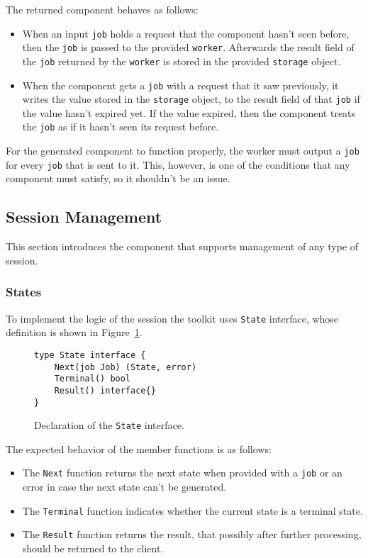 \newpage
The returned component behaves as follows:
\begin{itemize}
  \item When an input \texttt{job} holds a request that the component 
        hasn't seen before, then the \texttt{job} is passed to the 
        provided \texttt{worker}. Afterwards the result field of the \texttt{job}
        returned by the \texttt{worker} is stored in the provided 
        \texttt{storage} object.

  \item When the component gets a \texttt{job} with a request that it saw 
        previously, it writes the value stored in the \texttt{storage} object,
        to the result field of that \texttt{job} if the value hasn't expired yet. 
        If the value expired, then the component treats the \texttt{job} as if it
        hasn't seen its request before.
\end{itemize}

For the generated component to function properly, the worker must output
a \texttt{job} for every \texttt{job} that is sent to it. This, however, 
is one of the conditions that any component must satisfy, so it shouldn't 
be an issue.

\subsection{Session Management}
This section introduces the component that supports management of any
type of session.
\subsubsection{States}
\label{sec:state}
To implement the logic of the session the toolkit uses \texttt{State}
interface, whose definition is shown in Figure~\ref{fig:State}.
\begin{figure}[h]
\centering
\begin{lstlisting}
type State interface {
    Next(job Job) (State, error)
    Terminal() bool
    Result() interface{}
}
\end{lstlisting}
\caption[scale=1.0]{Declaration of the \texttt{State} interface.}
\label{fig:State}
\end{figure}
The expected behavior of the member functions is as follows:
\begin{itemize}
	\item The \texttt{Next} function returns the next state when provided 
          with a \texttt{job} or an error in case the next state can't be 
          generated.
	\item The \texttt{Terminal} function indicates whether the current 
          state is a terminal state.
	\item The \texttt{Result} function returns the result, that possibly 
          after further processing, should be returned to the client.
\end{itemize}

